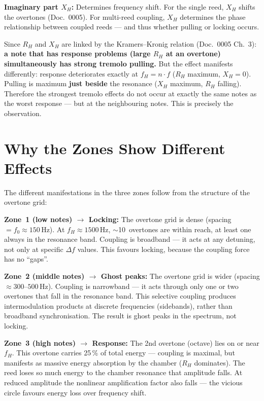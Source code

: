 \documentclass[11pt,a4paper]{article}
\begin{document}
\textbf{Imaginary part $X_H$:} Determines frequency shift. For the single reed, $X_H$ shifts the overtones (Doc.~0005). For multi-reed coupling, $X_H$ determines the phase relationship between coupled reeds --- and thus whether pulling or locking occurs.

Since $R_H$ and $X_H$ are linked by the Kramers--Kronig relation (Doc.~0005 Ch.~3): \textbf{a note that has response problems (large $R_H$ at an overtone) simultaneously has strong tremolo pulling.} But the effect manifests differently: response deteriorates exactly at $f_H = n \cdot f$ ($R_H$ maximum, $X_H = 0$). Pulling is maximum \textbf{just beside} the resonance ($X_H$ maximum, $R_H$ falling). Therefore the strongest tremolo effects do not occur at exactly the same notes as the worst response --- but at the neighbouring notes. This is precisely the observation.

\section{Why the Zones Show Different Effects}

The different manifestations in the three zones follow from the structure of the overtone grid:

\textbf{Zone~1 (low notes) $\to$ Locking:} The overtone grid is dense (spacing $= f_0 \approx 150$\,Hz). At $f_H \approx 1500$\,Hz, $\sim$10~overtones are within reach, at least one always in the resonance band. Coupling is broadband --- it acts at any detuning, not only at specific $\Delta f$ values. This favours locking, because the coupling force has no ``gaps''.

\textbf{Zone~2 (middle notes) $\to$ Ghost peaks:} The overtone grid is wider (spacing $\approx 300$--$500$\,Hz). Coupling is narrowband --- it acts through only one or two overtones that fall in the resonance band. This selective coupling produces intermodulation products at discrete frequencies (sidebands), rather than broadband synchronisation. The result is ghost peaks in the spectrum, not locking.

\textbf{Zone~3 (high notes) $\to$ Response:} The 2nd overtone (octave) lies on or near $f_H$. This overtone carries 25\,\% of total energy --- coupling is maximal, but manifests as massive energy absorption by the chamber ($R_H$ dominates). The reed loses so much energy to the chamber resonance that amplitude falls. At reduced amplitude the nonlinear amplification factor also falls --- the vicious circle favours energy loss over frequency shift.
\end{document}
